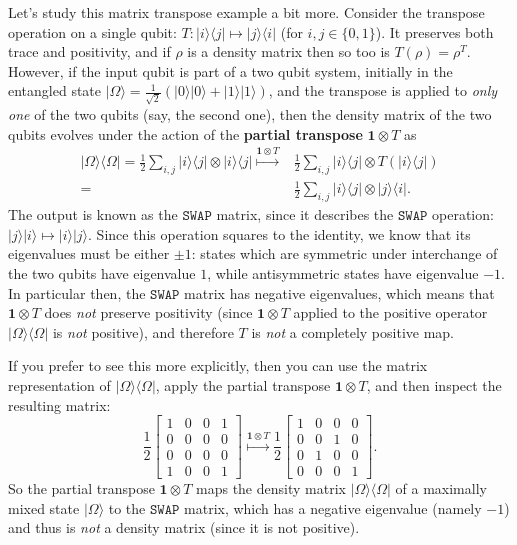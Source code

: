 \documentclass[fleqn,a4paper]{article}
\theoremstyle{definition}
\theoremstyle{definition}
\theoremstyle{definition}
\theoremstyle{definition}
\theoremstyle{remark}
\begin{document}
Let's study this matrix transpose example a bit more.
Consider the transpose operation on a single qubit: \(T\colon|i\rangle\langle j|\mapsto|j\rangle\langle i|\) (for \(i,j\in\{0,1\}\)).
It preserves both trace and positivity, and if \(\rho\) is a density matrix then so too is \(T(\rho)=\rho^T\).
However, if the input qubit is part of a two qubit system, initially in the entangled state \(|\Omega\rangle=\frac{1}{\sqrt{2}}(|0\rangle|0\rangle+|1\rangle|1\rangle)\), and the transpose is applied to \emph{only one} of the two qubits (say, the second one), then the density matrix of the two qubits evolves under the action of the \textbf{partial transpose} \(\mathbf{1}\otimes T\) as
\[
  \begin{aligned}
    |\Omega\rangle\langle\Omega|
    = \frac{1}{2}\sum_{i,j} |i\rangle\langle j| \otimes |i\rangle\langle j|
    \overset{\mathbf{1}\otimes T}{\longmapsto}
    &\frac{1}{2}\sum_{i,j} |i\rangle\langle j| \otimes T( |i\rangle\langle j|)
  \\= &\frac{1}{2}\sum_{i,j} |i\rangle\langle j| \otimes |j\rangle\langle i|.
  \end{aligned}
\]
The output is known as the \(\texttt{SWAP}\) matrix, since it describes the \(\texttt{SWAP}\) operation: \(|j\rangle|i\rangle\mapsto|i\rangle|j\rangle\).
Since this operation squares to the identity, we know that its eigenvalues must be either \(\pm1\): states which are symmetric under interchange of the two qubits have eigenvalue \(1\), while antisymmetric states have eigenvalue \(-1\).
In particular then, the \(\texttt{SWAP}\) matrix has negative eigenvalues, which means that \(\mathbf{1}\otimes T\) does \emph{not} preserve positivity (since \(\mathbf{1}\otimes T\) applied to the positive operator \(|\Omega\rangle\langle\Omega|\) is \emph{not} positive), and therefore \(T\) is \emph{not} a completely positive map.

If you prefer to see this more explicitly, then you can use the matrix representation of \(|\Omega\rangle\langle\Omega|\), apply the partial transpose \(\mathbf{1}\otimes T\), and then inspect the resulting matrix:
\[
  \frac{1}{2}\left[
  \begin{array}{cc|cc}
    1 & 0 & 0 & 1
  \\0 & 0 & 0 & 0
  \\\hline
    0 & 0 & 0 & 0
  \\1 & 0 & 0 & 1
  \end{array}\right]
  \overset{\mathbf{1}\otimes T}{\longmapsto}
  \frac{1}{2}\left[
  \begin{array}{cc|cc}
    1 & 0 & 0 & 0
  \\0 & 0 & 1 & 0
  \\\hline
    0 & 1 & 0 & 0
  \\0 & 0 & 0 & 1
  \end{array}\right].
\]
So the partial transpose \(\mathbf{1}\otimes T\) maps the density matrix \(|\Omega\rangle\langle\Omega|\) of a maximally mixed state \(|\Omega\rangle\) to the \(\texttt{SWAP}\) matrix, which has a negative eigenvalue (namely \(-1\)) and thus is \emph{not} a density matrix (since it is not positive).
\end{document}
